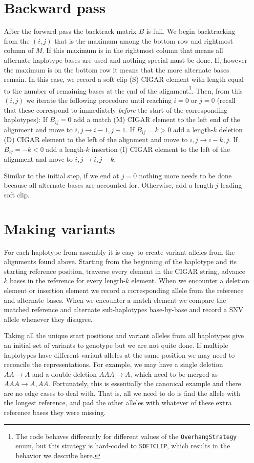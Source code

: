 \documentclass[nofootinbib,amssymb,amsmath]{revtex4}
\newcommand{\code}[1]{\texttt{#1}}
\begin{document}
\section{Backward pass}
After the forward pass the backtrack matrix $B$ is full.  We begin backtracking from the $(i,j)$ that is the maximum among the bottom row and rightmost column of $M$.  If this maximum is in the rightmost column that means all alternate haplotype bases are used and nothing special must be done.  If, however the maximum is on the bottom row it means that the more alternate bases remain.  In this case, we record a soft clip (S) CIGAR element with length equal to the number of remaining bases at the end of the alignment\footnote{The code behaves differently for different values of the \code{OverhangStrategy} enum, but this strategy is hard-coded to \code{SOFTCLIP}, which results in the behavior we describe here.}.  Then, from this $(i,j)$ we iterate the following procedure until reaching $i = 0$ or $j = 0$ (recall that these correspond to immediately \textit{before} the start of the corresponding haplotypes): If $B_{ij} = 0$ add a match (M) CIGAR element to the left end of the alignment and move to $i,j \rightarrow i - 1, j - 1$.  If $B_{ij} = k > 0$ add a length-$k$ deletion (D) CIGAR element to the left of the alignment and move to $i,j \rightarrow i - k, j$.  If $B_{ij} = -k < 0$ add a length-$k$ insertion (I) CIGAR element to the left of the alignment and move to $i,j \rightarrow i, j - k$.  

Similar to the initial step, if we end at $j = 0$ nothing more needs to be done because all alternate bases are accounted for.  Otherwise, add a length-$j$ leading soft clip.

\section{Making variants}
For each haplotype from assembly it is easy to create variant alleles from the alignments found above.  Starting from the beginning of the haplotype and its starting reference position, traverse every element in the CIGAR string, advance $k$ bases in the reference for every length-$k$ element.  When we encounter a deletion element or insertion element we record a corresponding allele from the reference and alternate bases.  When we encounter a match element we compare the matched reference and alternate sub-haplotypes base-by-base and record a SNV allele whenever they disagree.

Taking all the unique start positions and variant alleles from all haplotypes give an initial set of variants to genotype but we are not quite done.  If multiple haplotypes have different variant alleles at the same position we may need to reconcile the representations.  For example, we may have a single deletion $AA \rightarrow A$ and a double deletion $AAA \rightarrow A$, which need to be merged as $AAA \rightarrow A, AA$.  Fortunately, this is essentially the canonical example and there are no edge cases to deal with.  That is, all we need to do is find the allele with the longest reference, and pad the other alleles with whatever of these extra reference bases they were missing.
\end{document}
